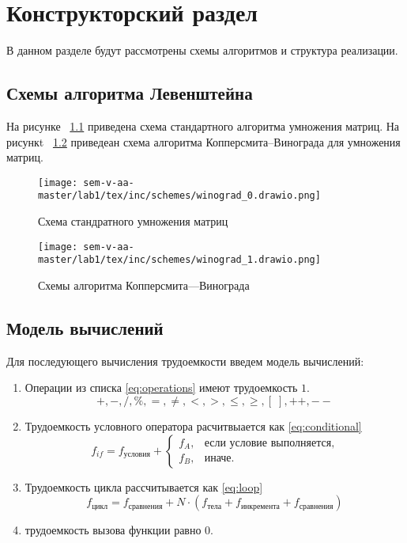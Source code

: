  \chapter{Конструкторский раздел}
\label{cha:design}


В данном разделе будут рассмотрены схемы алгоритмов и структура реализации.

\section{Схемы алгоритма Левенштейна}
На рисунке ~\ref{fig:simple} приведена схема стандартного алгоритма умножения матриц.
На рисункt ~\ref{fig:wino} приведеан схема алгоритма Копперсмита--Винограда для умножения матриц.

\begin{figure}
    \centering
    \texttt{[image: sem-v-aa-master/lab1/tex/inc/schemes/winograd\_0.drawio.png]}
    \caption{Схема стандратного умножения матриц}
    \label{fig:simple}
\end{figure}

\begin{figure}
    \caption{Схемы алгоритма Копперсмита---Винограда}
    \centering
    \texttt{[image: sem-v-aa-master/lab1/tex/inc/schemes/winograd\_1.drawio.png]}
    \label{fig:wino}
\end{figure}

\section{Модель вычислений}

Для последующего вычисления трудоемкости введем модель вычислений:
\begin{enumerate}[1.]
    \item Операции из списка \ref{eq:operations} имеют трудоемкость $1$. 
    \begin{equation}
        +,-,/,\%,=,\ne,<,>,\leq,\geq,[\;],++,--
        \label{operations}
    \end{equation}
    \item Трудоемкость условного оператора расчитвыается как \ref{eq:conditional}
    \begin{equation}
        f_{if} = f_{условия} + 
        \begin{cases}
            f_{A},& \text{если условие выполняется},\\
            f_{B},& \text{иначе}.
        \end{cases}
        \label{eq:conditional}
    \end{equation}
    \item Трудоемкость цикла рассчитывается как \ref{eq:loop}
    \begin{equation}
        f_{\text{цикл}} = f_{\text{сравнения}} + N \cdot (f_{\text{тела}} + f_{\text{инкремента}} + f_{\text{сравнения}})
        \label{eq:loop}
    \end{equation}
    \item трудоемкость вызова функции равно $0$.
\end{enumerate}

